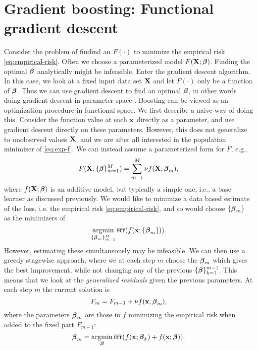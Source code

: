\section{Gradient boosting: Functional gradient descent}
Consider the problem of findind an $F(\cdot)$ to minimize the empirical risk \eqref{eq:empirical-risk}. Often we choose a parameterized model $F(\mathbf{X};\boldsymbol{\beta})$. Finding the optimal $\boldsymbol{\beta}$ analytically might be infeasible. Enter the gradient descent algorithm. In this case, we look at a fixed input data set $\mathbf{X}$ and let $F(\cdot)$ only be a function of $\boldsymbol{\beta}$. Thus we can use gradient descent to find an optimal $\boldsymbol{\beta}$, in other words doing gradient descent in parameter space \citep{friedman2001}. Boosting can be viewed as an optimization procedure in functional space. We first describe a naive way of doing this. Consider the function value at each $\mathbf{x}$ directly as a parameter, and use gradient descent directly on these parameters. However, this does not generalize to unobserved values $\mathbf{X}$, and we are after all interested in the population minimizer of \eqref{eq:exp-f}. We can instead assume a parameterized form for $F$, e.g.,
\begin{equation}\label{eq:gradboost}
    F(\mathbf{X};\{\boldsymbol{\beta}\}_{m=1}^M)=\sum_{m=1}^M\nu f(\mathbf{X};\boldsymbol{\beta}_m),
\end{equation}
where $f(\mathbf{X};\boldsymbol{\beta})$ is an additive model, but typically a simple one, i.e., a base learner as discussed previously. We would like to minimize a data based estimate of the loss, i.e. the empirical risk \eqref{eq:empirical-risk}, and so would choose $\{\boldsymbol{\beta}_m\}$ as the minimizers of 
\begin{equation*}
    \operatorname*{argmin}_{\{\boldsymbol{\beta}_m\}_{m=1}^M}\overline{\text{err}}(f(\mathbf{x};\{\boldsymbol{\beta}_m\})).
\end{equation*}
However, estimating these simultaneously may be infeasible. We can then use a greedy stagewise approach, where we at each step $m$ choose the $\boldsymbol{\beta}_m$ which gives the best improvement, while not changing any of the previous $\{\boldsymbol{\beta}\}_{k=1}^{m-1}$. This means that we look at the \textit{generalized residuals} given the previous parameters. At each step $m$ the current solution is
\begin{equation*}
    F_{m}=F_{m-1}+\nu f(\mathbf{x};\boldsymbol{\beta}_m),
\end{equation*}
where the parameters $\boldsymbol{\beta}_m$ are those in $f$ minimizing the empirical risk when added to the fixed part $F_{m-1}$:
\begin{equation*}
    \boldsymbol{\beta}_m=\operatorname*{argmin}_{\boldsymbol{\beta}}\overline{\text{err}}(f(\mathbf{x};\boldsymbol{\beta}_k)+f(\mathbf{x};\boldsymbol{\beta})).
\end{equation*}
